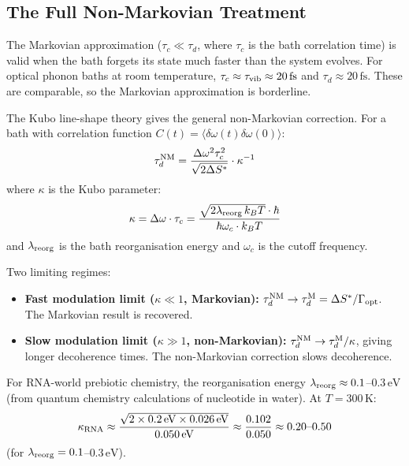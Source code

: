 \documentclass[12pt,a4paper]{article}
\begin{document}
\subsection{The Full Non-Markovian Treatment}

The Markovian approximation ($\tau_c\ll\tau_d$, where $\tau_c$ is the bath correlation time) is valid when the bath forgets its state much faster than the system evolves.  For optical phonon baths at room temperature, $\tau_c\approx\tau_{\rm vib}\approx20\,\mathrm{fs}$ and $\tau_d\approx20\,\mathrm{fs}$.  These are comparable, so the Markovian approximation is borderline.

The Kubo line-shape theory \cite{Kubo1962} gives the general non-Markovian correction.  For a bath with correlation function $C(t)=\langle\delta\omega(t)\delta\omega(0)\rangle$:
\begin{equation}
  \tau_d^{\rm NM} = \frac{\Delta\omega^2\tau_c^2}{\sqrt{2\Delta S^*}}\cdot\kappa^{-1}
  \label{eq:NM_tau}
\end{equation}
where $\kappa$ is the Kubo parameter:
\begin{equation}
  \kappa = \Delta\omega\cdot\tau_c = \frac{\sqrt{2\lambda_{\rm reorg}\,k_BT}\cdot\hbar}{\hbar\omega_c\cdot k_BT}
  \label{eq:kappa}
\end{equation}
and $\lambda_{\rm reorg}$ is the bath reorganisation energy and $\omega_c$ is the cutoff frequency.

Two limiting regimes:
\begin{itemize}
  \item \textbf{Fast modulation limit ($\kappa\ll1$, Markovian):} $\tau_d^{\rm NM}\to\tau_d^{\rm M}=\Delta S^*/\Gamma_{\rm opt}$.  The Markovian result is recovered.
  \item \textbf{Slow modulation limit ($\kappa\gg1$, non-Markovian):} $\tau_d^{\rm NM}\to\tau_d^{\rm M}/\kappa$, giving longer decoherence times.  The non-Markovian correction slows decoherence.
\end{itemize}

For RNA-world prebiotic chemistry, the reorganisation energy $\lambda_{\rm reorg}\approx0.1$--$0.3\,\mathrm{eV}$ (from quantum chemistry calculations of nucleotide in water).  At $T=300\,\mathrm{K}$:
\begin{equation}
  \kappa_{\rm RNA} \approx \frac{\sqrt{2\times0.2\,\mathrm{eV}\times0.026\,\mathrm{eV}}}{0.050\,\mathrm{eV}} \approx \frac{0.102}{0.050} \approx 0.20\text{--}0.50
\end{equation}
(for $\lambda_{\rm reorg}=0.1$--$0.3\,\mathrm{eV}$).
\end{document}
